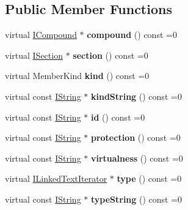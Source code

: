 \subsection*{Public Member Functions}
\begin{DoxyCompactItemize}
\item 
\mbox{\label{class_i_member_a17b671a723e1b5b0f022c05e11f91349}} 
virtual \mbox{\hyperlink{class_i_compound}{I\+Compound}} $\ast$ {\bfseries compound} () const =0
\item 
\mbox{\label{class_i_member_a1bbf93636786bbfd05668dd5bb1a2ba4}} 
virtual \mbox{\hyperlink{class_i_section}{I\+Section}} $\ast$ {\bfseries section} () const =0
\item 
\mbox{\label{class_i_member_af571ce58747f72ee41263c19f876d6bb}} 
virtual Member\+Kind {\bfseries kind} () const =0
\item 
\mbox{\label{class_i_member_a576260c89b37107f38599bb7198d4231}} 
virtual const \mbox{\hyperlink{class_i_string}{I\+String}} $\ast$ {\bfseries kind\+String} () const =0
\item 
\mbox{\label{class_i_member_a7f4ef36c8d6435bcebe2e2798013ed36}} 
virtual const \mbox{\hyperlink{class_i_string}{I\+String}} $\ast$ {\bfseries id} () const =0
\item 
\mbox{\label{class_i_member_a9385938340a0bcbc9c1469d7c7cc3c6b}} 
virtual const \mbox{\hyperlink{class_i_string}{I\+String}} $\ast$ {\bfseries protection} () const =0
\item 
\mbox{\label{class_i_member_afe73ab6bccb65f84fde62ccd4fe4bd5d}} 
virtual const \mbox{\hyperlink{class_i_string}{I\+String}} $\ast$ {\bfseries virtualness} () const =0
\item 
\mbox{\label{class_i_member_ae7a0aa97e86a85d82b8bbe6d6e4f1f12}} 
virtual \mbox{\hyperlink{class_i_linked_text_iterator}{I\+Linked\+Text\+Iterator}} $\ast$ {\bfseries type} () const =0
\item 
\mbox{\label{class_i_member_ae03170d5783f1bdfc70f4b0fe172f641}} 
virtual const \mbox{\hyperlink{class_i_string}{I\+String}} $\ast$ {\bfseries type\+String} () const =0

\end{DoxyCompactItemize}
